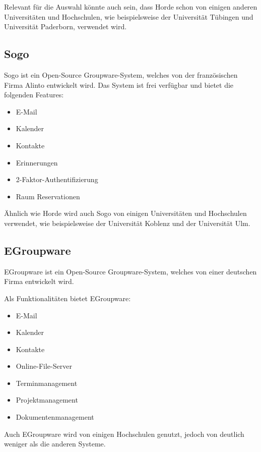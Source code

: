 Relevant für die Auswahl könnte auch sein, dass Horde schon von einigen anderen Universitäten und Hochschulen, wie beispielsweise der Universität Tübingen und Universität Paderborn, verwendet wird.

\subsection{Sogo}

Sogo ist ein Open-Source Groupware-System, welches von der französischen Firma Alinto entwickelt wird.
Das System ist frei verfügbar und bietet die folgenden Features:

\begin{itemize}
    \item E-Mail
    \item Kalender
    \item Kontakte
    \item Erinnerungen
    \item 2-Faktor-Authentifizierung
    \item Raum Reservationen
\end{itemize}
\autocite[Quelle:][]{sogo}

Ähnlich wie Horde wird auch Sogo von einigen Universitäten und Hochschulen verwendet, wie beispielsweise der Universität Koblenz und der Universität Ulm.

\subsection{EGroupware}

EGroupware ist ein Open-Source Groupware-System, welches von einer deutschen Firma entwickelt wird.

Als Funktionalitäten bietet EGroupware:

\begin{itemize}
    \item E-Mail
    \item Kalender
    \item Kontakte
    \item Online-File-Server
    \item Terminmanagement
    \item Projektmanagement
    \item Dokumentenmanagement
\end{itemize}

Auch EGroupware wird von einigen Hochschulen genutzt, jedoch von deutlich weniger als die anderen Systeme.


